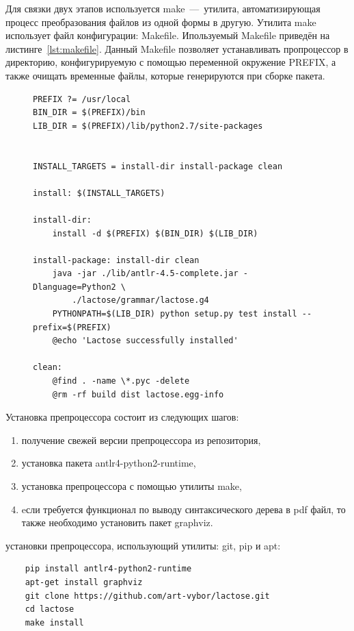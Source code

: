 \documentclass[12pt,a4paper,oneside]{extarticle}
\begin{document}
        Для связки двух этапов используется make~---~утилита, автоматизирующая процесс преобразования файлов из одной формы в другую.
        Утилита make использует файл конфигурации: Makefile.
        Ипользуемый Makefile приведён на листинге~\ref{lst:makefile}.
        Данный Makefile позволяет устанавливать пропроцессор в директорию, конфигурируемую с помощью переменной окружение PREFIX, а также очищать временные файлы, которые генерируются при сборке пакета.

        \begin{figure}[h!]  
            \begin{lstlisting}[label={lst:makefile},caption={Cкрипт конфигурации для утилиты make},captionpos=b]
PREFIX ?= /usr/local
BIN_DIR = $(PREFIX)/bin
LIB_DIR = $(PREFIX)/lib/python2.7/site-packages


INSTALL_TARGETS = install-dir install-package clean

install: $(INSTALL_TARGETS)

install-dir:
    install -d $(PREFIX) $(BIN_DIR) $(LIB_DIR)

install-package: install-dir clean
    java -jar ./lib/antlr-4.5-complete.jar -Dlanguage=Python2 \
        ./lactose/grammar/lactose.g4
    PYTHONPATH=$(LIB_DIR) python setup.py test install --prefix=$(PREFIX)
    @echo 'Lactose successfully installed'

clean:
    @find . -name \*.pyc -delete
    @rm -rf build dist lactose.egg-info

            \end{lstlisting}
        \end{figure}

        \noindent Установка препроцессора состоит из следующих шагов:
        \begin{enumerate}
                \item получение свежей версии препроцессора из репозитория,
                \item установка пакета antlr4-python2-runtime,
                \item установка препроцессора с помощью утилиты make,
                \item eсли требуется функционал по выводу синтаксического дерева в pdf файл, то также необходимо установить пакет graphviz.
        \end{enumerate}

         установки препроцессора, использующий утилиты: git, pip и apt:  
        \begin{lstlisting}
    pip install antlr4-python2-runtime
    apt-get install graphviz
    git clone https://github.com/art-vybor/lactose.git
    cd lactose
    make install
        \end{lstlisting}
    \clearpage
    
\end{document}
